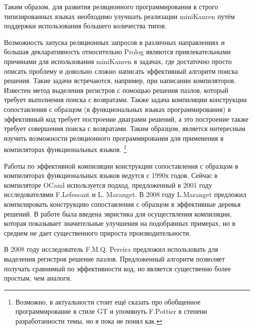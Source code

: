 Таким образом, для развития реляционного программирования в строго типизированных языках необходимо улучшать реализации miniKanren путём поддержки использования большего количества типов. 

Возможность запуска реляционных запросов в различных направлениях и большая декларативность относительно Prolog являются привлекательными причинами для использования miniKanren в задачах, где достаточно просто описать проблему и довольно сложно написать эффективный алгоритм поиска решения. Такие задачи встречаются, например, при написании компиляторов. Известен метод выделения регистров с помощью решения пазлов, который требует выполнения поиска с возвратами. Также задача компиляции конструкции сопоставления с образцом  (в функциональных языках программирования) в эффективный код требует построение диаграмм решений, а это построение также требует совершения поиска с возвратами. Таким образцом, является интересным изучить возможности реляционного программирования для применения в компиляторах функциональных языков.
\footnote{Возможно, в актуальности стоит ещё сказать про обобщенное программирование в стиле GT и упомянуть F.Pottier в степени разработанности темы, но я пока не понял как.}

{\progress}
Работы по эффективной компиляции конструкции сопоставления с образцом в компиляторах функциональных языков ведутся с 1990х годов. Сейчас в компиляторе OCaml используется подход, предложенный в 2001 году исследователями F.Lefessant и L. Maranget. В 2008 году L.Maranget предложил компилировать конструкцию сопоставления с образцом в эффективные деревья решений. В работе была введена эвристика для осуществления компиляции, которая показывает значительные улучшения на подобранных примерах, но в среднем не дает существенного прироста производительности.

В 2008 году исследователь F.M.Q. Pereira предложил использовать для выделения регистров решение пазлов. Предложенный алгоритм позволяет получать сравнимый по эффективности код, но является существенно более простым, чем аналоги.

